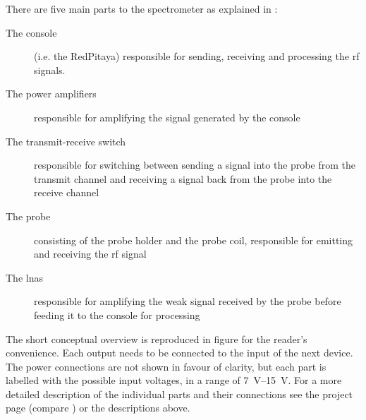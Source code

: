 There are five main parts to the spectrometer as explained in :
\begin{description}
    \item[The console] (i.e. the RedPitaya) responsible for sending, receiving and processing the \acrshort{rf} signals.
    \item[The power amplifiers] responsible for amplifying the signal generated by the console
    \item[The transmit-receive switch] responsible for switching between sending a signal into the probe from the transmit channel and receiving a signal back from the probe into the receive channel
    \item[The probe] consisting of the probe holder and the probe coil, responsible for emitting and receiving the \acrshort{rf} signal
    \item[The \acrlong{lna}s] responsible for amplifying the weak signal received by the probe before feeding it to the console for processing
\end{description}
The short conceptual overview is reproduced in figure  for the reader's convenience. Each output needs to be connected to the input of the next device. The power connections are not shown in favour of clarity, but each part is labelled with the possible input voltages, in a range of \qtyrange{7}{15}{\volt}. For a more detailed description of the individual parts and their connections see the \magnethical{} project page (compare ) or the descriptions above.

